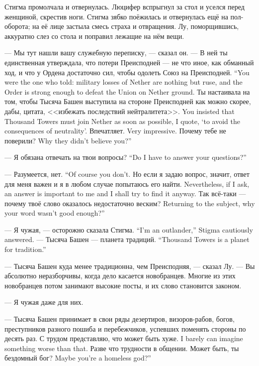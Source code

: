 Стигма промолчала и отвернулась.
Люцифер вспрыгнул за стол и уселся перед женщиной, скрестив ноги.
Стигма зябко поёжилась и отвернулась ещё на пол-оборота;
на её лице застыла смесь страха и отвращения.
Лу, поморщившись, аккуратно слез со стола и поправил лежащие на нём вещи.

--- Мы тут нашли вашу служебную переписку, --- сказал он.
{--- В ней ты единственная утверждала, что потери Преисподней --- не что иное, как обманный ход, и что у Ордена достаточно сил, чтобы одолеть Союз на Преисподней.}
{``You were the one who told: military losses of Nether are nothing but ruse, and the Order is strong enough to defeat the Union on Nether ground.}
{Ты настаивала на том, чтобы Тысяча Башен выступила на стороне Преисподней как можно скорее, дабы, цитата, <<избежать последствий нейтралитета>>.}
{You insisted that Thousand Towers must join Nether as soon as possible, I quote, `to avoid the consequences of neutrality'.}
{Впечатляет.}
{Very impressive.}
{Почему тебе не поверили?}
{Why they didn't believe you?''}

{--- Я обязана отвечать на твои вопросы?}
{``Do I have to answer your questions?''}

{--- Разумеется, нет.}
{``Of course you don't.}
{Но если я задаю вопрос, значит, ответ для меня важен и я в любом случае попытаюсь его найти.}
{Nevertheless, if I ask, an answer is important to me and I shall try to find it anyway.}
{Так всё-таки --- почему твоё слово оказалось недостаточно веским?}
{Returning to the subject, why your word wasn't good enough?''}

{--- Я чужая, --- осторожно сказала Стигма.}
{``I'm an outlander,'' Stigma cautiously answered.}
{--- Тысяча Башен --- планета традиций.}
{``Thousand Towers is a planet for tradition.''}

--- Тысяча Башен куда менее традиционна, чем Преисподняя, --- сказал Лу.
--- Вы абсолютно неразборчивы, когда дело касается новобранцев.
Многие из этих новобранцев потом занимают высокие посты, и их слово становится законом.

--- Я чужая даже для них.

--- Тысяча Башен принимает в свои ряды дезертиров, визоров-рабов, богов, преступников разного пошиба и перебежчиков, успевших поменять стороны по десять раз.
{С трудом представляю, что может быть хуже.}
{I barely can imagine something worse than that.}
Разве что трудности в общении.
{Может быть, ты бездомный бог?}
{Maybe you're a homeless god?''}

